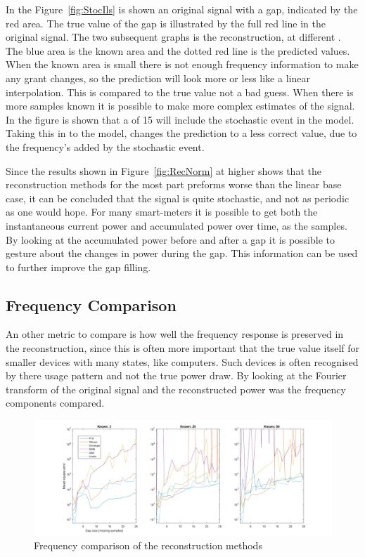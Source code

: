 In the Figure~\ref{fig:StocIls} is shown an original signal with a gap, indicated by the red area. The true value of the gap is illustrated by the full red line in the original signal. The two subsequent graphs is the reconstruction, at different . The blue area is the known area and the dotted red line is the predicted values. When the known area is small there is not enough frequency information to make any grant changes, so the prediction will look more or less like a linear interpolation. This is compared to the true value not a bad guess. When there is more samples known it is possible to make more complex estimates of the signal. In the figure is shown that a  of 15 will include the stochastic event in the model. Taking this in to the model, changes the prediction to a less correct value, due to the frequency's added by the stochastic event. 

Since the results shown in Figure~\ref{fig:RecNorm} at higher  shows that the reconstruction methods for the most part preforms worse than the linear base case, it can be concluded that the signal is quite stochastic, and not as periodic as one would hope. For many smart-meters it is possible to get both the instantaneous current power and accumulated power over time, as the samples. By looking at the accumulated power before and after a gap it is possible to gesture about the changes in power during the gap. This information can be used to further improve the gap filling. 

\newpage

\subsection{Frequency Comparison}
An other metric to compare is how well the frequency response is preserved in the reconstruction, since this is often more important that the true value itself for smaller devices with many states, like computers. Such devices is often recognised by there usage pattern and not the true power draw. By looking at the Fourier transform of the original signal and the reconstructed power was the frequency components compared. 

\begin{figure}[H]
\centering
\includegraphics[width=1\textwidth]{billeder/RecFeq.png}
\caption{Frequency comparison of the reconstruction methods}
\label{fig:RecFeq}
\end{figure}

